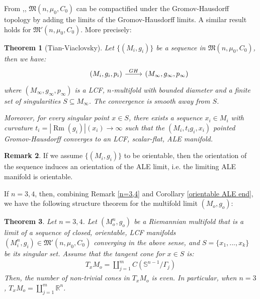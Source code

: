 \documentclass[12pt]{amsart}
\newtheorem{theorem}{Theorem}[section]
\theoremstyle{definition}
\newtheorem{remark}[theorem]{Remark}
\begin{document}
From \cite{Aku},\cite{TV2}, $\mathfrak{M}(n, \mu_0, C_0)$ can be compactified under the Gromov-Hausdorff topology by adding the limits of the Gromov-Hausdorff limits. A similar result holds for $\mathfrak{M}'(n, \mu_0, C_0)$. More precisely:
\begin{theorem}[Tian-Viaclovsky]
    Let $\{(M_i,g_i)\}$ be a sequence in $\mathfrak{M}(n,\mu_0, C_0)$, then we have:
    \begin{align*}
        \begin{tikzcd}[ampersand replacement=\&]
         \& (M_i,g_i, p_i) \arrow[r, "GH"] 
         \& (M_\infty, g_\infty, p_\infty)
      \end{tikzcd}
    \end{align*}
    where $(M_\infty, g_\infty, p_\infty)$ is a LCF, $n$-multifold with bounded diameter and a finite set of singularities $S\subseteq M_\infty$. The convergence is smooth away from $S$. 

    Moreover, for every singular point $x\in S$, there exists a sequence $x_i \in M_i$ with curvature $t_i = |\operatorname{Rm}(g_i)|(x_i)\to\infty$ such that the $(M_i, t_i g_i, x_i)$ pointed Gromov-Hausdorff converges to an LCF, scalar-flat, ALE manifold.
\end{theorem}

\begin{remark}
    If we assume $\{(M_i,g_i)\}$ to be orientable, then the orientation of the sequence induces an orientation of the ALE limit, i.e. the limiting ALE manifold is orientable.
\end{remark}

If $n = 3,4$, then, combining Remark \ref{n=3,4} and Corollary \ref{orientable ALE end}, we have the following structure theorem for the multifold limit $(M_o, g_o)$:

\begin{theorem}\label{GH limit}
    Let $n = 3,4$. Let $(M^n_o, g_o)$ be a Riemannian multifold that is a limit of a sequence of closed, orientable, LCF manifolds $(M_i^n, g_i) \in \mathfrak{M}'(n, \mu_0, C_0)$ converging in the above sense, and $S = \{x_1,...,x_k\}$ be its singular set. Assume that the tangent cone for $x\in S$ is:
    \begin{align*}
        T_x M_o = \coprod_{j=1}^m C(\mathbb{S}^{n-1}/\Gamma_j)
    \end{align*}
    Then, the number of non-trivial cones in $T_x M_o$ is even. In particular, when $n =3$, $T_x M_o = \coprod_{j=1}^m \mathbb{R}^n$.
\end{theorem}
\end{document}

